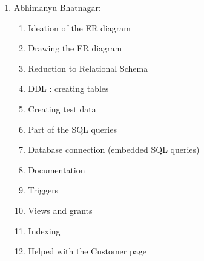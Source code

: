 \documentclass[12pt]{report}
\begin{document}
	\begin{enumerate}
		\item Abhimanyu Bhatnagar:
			\begin{enumerate}
				\item Ideation of the ER diagram
				\item Drawing the ER diagram
				\item Reduction to Relational Schema
				\item DDL : creating tables
				\item Creating test data
				\item Part of the SQL queries
				\item Database connection (embedded SQL queries)
				\item Documentation
				\item Triggers
                \item Views and grants
                \item Indexing             
                \item Helped with the Customer page
            \end{enumerate}



\end{enumerate}
\end{document}
